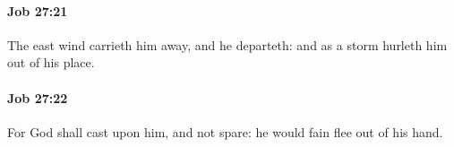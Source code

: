 		\paragraph{Job 27:21} %
			\label{JOB-27-21}

			The east wind carrieth him away, and he departeth: and as a storm hurleth him out of his place.


		\paragraph{Job 27:22} %
			\label{JOB-27-22}

			For God shall cast upon him, and not spare: he would fain flee out of his hand.


